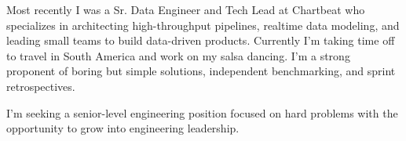 
\begin{cvparagraph}

	Most recently I was a Sr. Data Engineer and Tech Lead at Chartbeat who specializes in architecting high-throughput pipelines, realtime data modeling, and leading small teams to build data-driven products. Currently I'm taking time off to travel in South America and work on my salsa dancing. I'm a strong proponent of boring but simple solutions, independent benchmarking, and sprint retrospectives.
	
	I'm seeking a senior-level engineering position focused on hard problems with the opportunity to grow into engineering leadership.
	
\end{cvparagraph}


